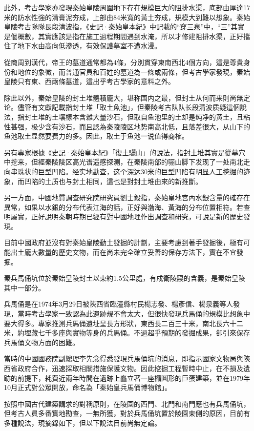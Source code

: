 此外，考古學家亦發現秦始皇陵周圍地下存在規模巨大的阻排水渠，底部由厚達17米的防水性強的清膏泥夯成，上部由84米寬的黃土夯成，規模大到難以想象。秦始皇陵考古隊隊長段清波指，《史記·秦始皇本紀》中記載的“穿三泉”中，“三”其實是個概數，其實應該是指在施工過程期間遇到水淹，所以才修建阻排水渠，正好擋住了地下水由高向低滲透，有效保護墓室不遭水浸。

從商周到漢代，帝王的墓道通常都為4條，分別貫穿東南西北4個方向，這是尊貴身份和地位的象徵，而普通官員和百姓的墓道為一條或兩條，但考古學家發現，秦始皇陵只有東、西兩條墓道，這出乎考古學家的意料之外。

除此以外，秦始皇陵的封土堆體積龐大，堪称国内之最，但封土从何而来則尚無定论。儘管有文獻記載指封土堆「取土魚池」，但秦陵考古队队长段清波质疑這個說法，指封土堆的土壤樣本含雜大量沙石，但取自鱼池里的土却是纯净的黄土，且粘性甚强，极少含有沙石，而且認為秦陵陵区地势南高北低，且落差很大，从山下的鱼池取土显然要费力的多。因此，取土于鱼池一说值得商榷。

另有專家根據《史記·秦始皇本紀》「復土驪山」的說法，指封土堆其實是從墓穴中挖来，但經秦陵陵区高光谱遥感探测，在秦陵南部的骊山脚下发现了一处南北走向串珠状的巨型凹陷。经实地勘查，这个深达30米的巨型凹陷有明显人工挖掘的迹象，而凹陷的土质也与封土相同，這也是對封土堆由來的新推斷。

另一方面，中國地質調查研究院研究員劉士毅指，秦始皇地宮內水銀含量的確存在異常，如果以水銀的分布代表江海的話，正好與渤海、黃海的分布位置相符。若查明屬實，正好說明秦朝時期已經有對中國地理作出調查和研究，可說是新的歷史發現。

目前中國政府並沒有對秦始皇陵動土發掘的計劃，主要考慮到著手發掘後，極有可能出土龐大數量的歷史文物，而在尚未完全確立妥善的保存方法下，實在不宜發掘。

秦兵馬俑坑位於秦始皇陵封土以東約1.5公里處，有戍衛陵寢的含義，是秦始皇陵其中一部分。

兵馬俑是在1974年3月29日被陝西省臨潼縣村民楊志發、楊彥信、楊泉義等人發現，當時考古學家一致認為此遺跡規不會太大，但很快發現兵馬俑的規模比想象中要大得多。專家推測兵馬俑遺址呈長方形狀，東西長二百三十米，南北長六十二米，約埋藏七千多座與實物等身的兵馬俑。不過超乎預期的發掘成果，卻引來保存兵馬俑文物方面的困難。

當時的中國國務院副總理李先念得悉發現兵馬俑坑的消息，即指示國家文物局與陝西省政府合作，迅速採取相關措施保護文物。因此挖掘工程暫時中止，在不損及遺跡的前提下，耗費近兩年時間在遺跡上矗立著一座橢圓形的巨蛋建築，並在1979年10月正式對公眾開放，命名為「秦始皇兵馬俑博物館」。

按照中國古代建築講求的對稱原則，在陵園的西門、北門和南門應也有兵馬俑坑，但考古人員多番實地勘查，一無所獲，對於兵馬俑坑置於陵園東側的原因，目前有多種說法，現摘錄如下，但以下說法目前尚無定論。

